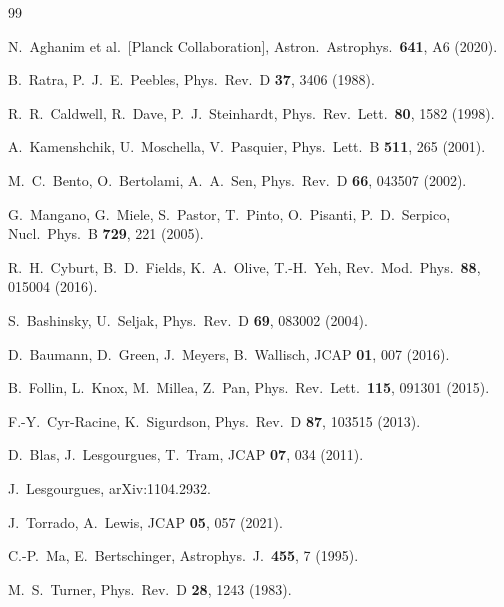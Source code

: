 \documentclass[epj]{svjour}
\begin{document}
\begin{thebibliography}{99}

N.~Aghanim et al.\ [Planck Collaboration],
Astron.\ Astrophys.\ \textbf{641}, A6 (2020).

B.~Ratra, P.~J.~E.~Peebles,
Phys.\ Rev.\ D \textbf{37}, 3406 (1988).

R.~R.~Caldwell, R.~Dave, P.~J.~Steinhardt,
Phys.\ Rev.\ Lett.\ \textbf{80}, 1582 (1998).

A.~Kamenshchik, U.~Moschella, V.~Pasquier,
Phys.\ Lett.\ B \textbf{511}, 265 (2001).

M.~C.~Bento, O.~Bertolami, A.~A.~Sen,
Phys.\ Rev.\ D \textbf{66}, 043507 (2002).

G.~Mangano, G.~Miele, S.~Pastor, T.~Pinto, O.~Pisanti,
P.~D.~Serpico,
Nucl.\ Phys.\ B \textbf{729}, 221 (2005).

R.~H.~Cyburt, B.~D.~Fields, K.~A.~Olive, T.-H.~Yeh,
Rev.\ Mod.\ Phys.\ \textbf{88}, 015004 (2016).

S.~Bashinsky, U.~Seljak,
Phys.\ Rev.\ D \textbf{69}, 083002 (2004).

D.~Baumann, D.~Green, J.~Meyers, B.~Wallisch,
JCAP \textbf{01}, 007 (2016).

B.~Follin, L.~Knox, M.~Millea, Z.~Pan,
Phys.\ Rev.\ Lett.\ \textbf{115}, 091301 (2015).

F.-Y.~Cyr-Racine, K.~Sigurdson,
Phys.\ Rev.\ D \textbf{87}, 103515 (2013).

D.~Blas, J.~Lesgourgues, T.~Tram,
JCAP \textbf{07}, 034 (2011).

J.~Lesgourgues,
arXiv:1104.2932.

J.~Torrado, A.~Lewis,
JCAP \textbf{05}, 057 (2021).

C.-P.~Ma, E.~Bertschinger,
Astrophys.\ J.\ \textbf{455}, 7 (1995).

M.~S.~Turner,
Phys.\ Rev.\ D \textbf{28}, 1243 (1983).


\end{thebibliography}
\end{document}
